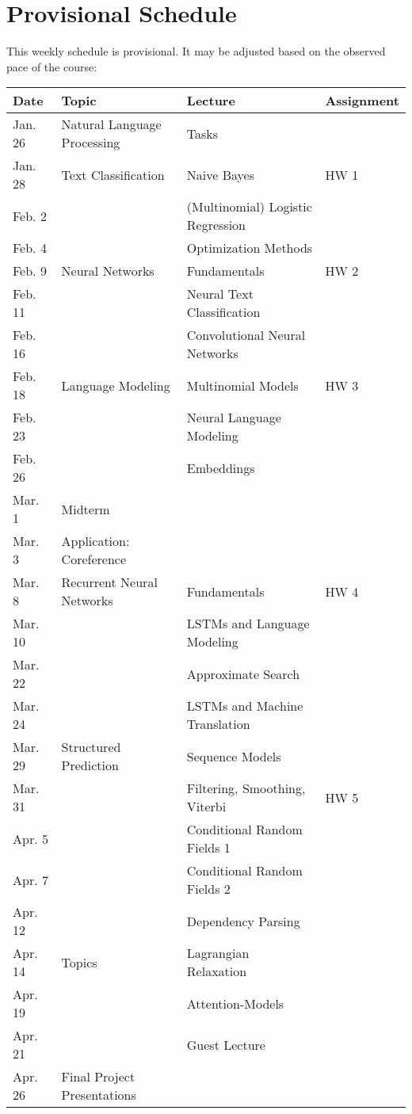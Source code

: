 \documentclass[11pt]{article}
\begin{document}
\section{Provisional Schedule}

This weekly schedule is provisional. It may be adjusted based on the observed pace of the course:
\vspace {0.25cm}

 \begin{center}
\begin{tabular}{llll}
\toprule
Date &Topic &Lecture &Assignment \\
\midrule
Jan. 26 & Natural Language Processing& Tasks & \\
Jan. 28 & Text Classification & Naive Bayes & HW 1 \\
Feb. 2  & & (Multinomial) Logistic Regression \\
Feb. 4  & & Optimization Methods \\
Feb. 9  & Neural Networks & Fundamentals & HW 2 \\
Feb. 11 & & Neural Text Classification & \\
Feb. 16 & & Convolutional Neural Networks &\\
Feb. 18 & Language Modeling & Multinomial Models & HW 3 \\
Feb. 23 & & Neural Language Modeling & \\
Feb. 26 & & Embeddings  & \\
Mar. 1 & Midterm  & \\
Mar. 3 & Application: Coreference \\
Mar. 8 & Recurrent Neural Networks & Fundamentals & HW 4 \\
Mar. 10 & & LSTMs and Language Modeling & \\
Mar. 22& & Approximate Search & \\
Mar. 24 & & LSTMs and Machine Translation & \\
Mar. 29 & Structured Prediction & Sequence Models &  \\
Mar. 31& & Filtering, Smoothing, Viterbi & HW 5 \\ 
Apr. 5 & & Conditional Random Fields 1 & \\
Apr. 7 & & Conditional Random Fields 2  \\
Apr. 12 & & Dependency Parsing \\
Apr. 14 & Topics & Lagrangian Relaxation  \\
Apr. 19 &  & Attention-Models \\
Apr. 21& & Guest Lecture \\
Apr. 26 & Final Project Presentations \\
\bottomrule
\end{tabular}
 \end{center}
\end{document}
